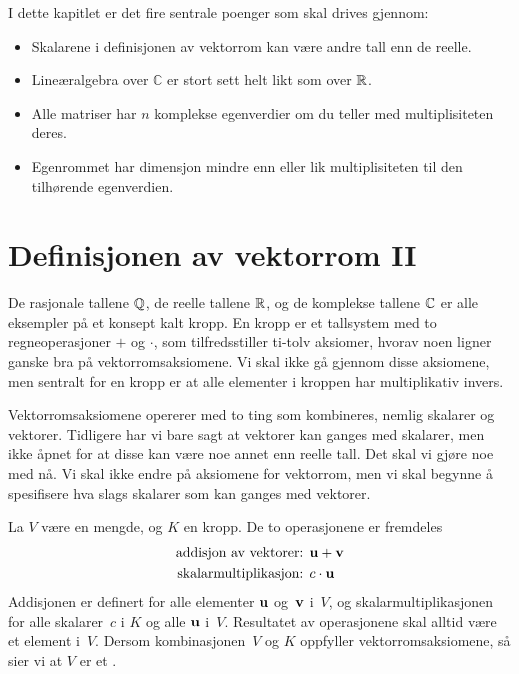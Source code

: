 

\label{ch:kompleks-linear-algebra}

I dette kapitlet er det fire sentrale poenger som skal drives gjennom:

\begin{itemize}
\item Skalarene i definisjonen av vektorrom kan være andre tall enn de reelle.

\item Lineæralgebra over $\mathbb C$ er stort sett helt likt som over $\mathbb{R}$.

\item Alle matriser har $n$ komplekse egenverdier om du teller med multiplisiteten deres.
 
\item Egenrommet har dimensjon mindre enn eller lik multiplisiteten til den tilhørende egenverdien.
\end{itemize}

\section*{Definisjonen av vektorrom II}

De rasjonale tallene $\mathbb{Q}$, de reelle tallene $\mathbb{R}$, 
og de komplekse tallene $\mathbb{C}$ er alle eksempler på et konsept kalt kropp. 
En kropp er et tallsystem med to regneoperasjoner $+$ og $\cdot$, 
som tilfredsstiller ti-tolv aksiomer, 
hvorav noen ligner ganske bra på vektorromsaksiomene. 
Vi skal ikke gå gjennom disse aksiomene, 
men sentralt for en kropp er at alle elementer i kroppen har multiplikativ invers.

Vektorromsaksiomene opererer med to ting som kombineres, nemlig skalarer og vektorer. 
Tidligere har vi bare sagt at vektorer kan ganges med skalarer, 
men ikke åpnet for at disse kan være noe annet enn reelle tall. 
Det skal vi gjøre noe med nå. 
Vi skal ikke endre på aksiomene for vektorrom, 
men vi skal begynne å spesifisere hva slags skalarer som kan ganges med vektorer. 

\begin{defn}
La $V$ være en mengde, og $K$ en kropp. De to operasjonene er fremdeles
\begin{align*}
\text{addisjon av vektorer: } & \mathbf{u} + \mathbf{v} \\
\text{skalarmultiplikasjon: } & c \cdot \mathbf{u}
\end{align*}
Addisjonen er definert for alle elementer $\mathbf{u}$ og~$\mathbf{v}$
i~$V$, og skalarmultiplikasjonen for alle skalarer~$c$ i $K$ og alle $\mathbf{u}$
i~$V$.  Resultatet av operasjonene skal alltid være et element i~$V$.
Dersom kombinasjonen~$V$ og $K$ oppfyller vektorromsaksiomene, 
så sier vi at $V$ er et .
\end{defn}


